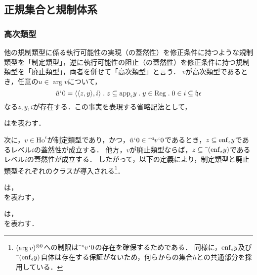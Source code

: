 
\subsection{正規集合と規制体系}
\label{ssec:正規集合と規制体系}

\subsubsection{高次類型}
\label{sssec:高次類型}

他の規制類型に係る執行可能性の実現（の蓋然性）を修正条件に持つような規制類型を「制定類型」，逆に執行可能性の阻止（の蓋然性）を修正条件に持つ規制類型を「廃止類型」，両者を併せて「高次類型」と言う．
$ v $が高次類型であるとき，任意の$ u\in\arg v $について，
\[
    \tilde{u}\fap 0 = \orp{\orp{z,y},i}\con{1}z\subseteq\app{\epsilon}y\con{1}y\in\mathrm{Reg}\con{1}0\in i\subseteq\indx{\epsilon}
\]
なる$ z,y,i $が存在する．この事実を表現する省略記法として，
\begin{df}
\label{df:高次類型}
はを表わす．
\end{df}
\noindent 次に，$v\in\mathrm{Ho}^{\epsilon}$が制定類型であり，かつ，$ \tilde{u}{\mspace{1mu}{`}\mspace{1mu}} 0\in \tilde{\:\:}{^\triangleleft}v{\mspace{1mu}{`}\mspace{1mu}} 0 $であるとき，$z\subseteq\mathrm{enf}_{\epsilon}y$であるレベル$i$の蓋然性が成立する．
他方，$v$が廃止類型ならば，$z\subseteq\bar{\:\:}(\mathrm{enf}_{\epsilon}y)$であるレベル$i$の蓋然性が成立する．
したがって，以下の定義により，制定類型と廃止類型それぞれのクラスが導入される\footnote{
    $ (\arg v)^{\otimes 0} $への制限は$ \tilde{\:\:}{^\triangleleft}v{\mspace{1mu}{`}\mspace{1mu}} 0 $の存在を確保するためである．
    同様に，$\mathrm{enf}_{\epsilon}y$及び$\bar{\:\:}(\mathrm{enf}_{\epsilon}y)$自体は存在する保証がないため，何らからの集合$h$との共通部分を採用している．
}．

\begin{df}
\label{df:制定類型}
は，\\\hfill
{}を表わす，
\end{df}

\begin{df}
\label{df:廃止類型}
は，\\\hfill
{}を表わす．
\end{df}

